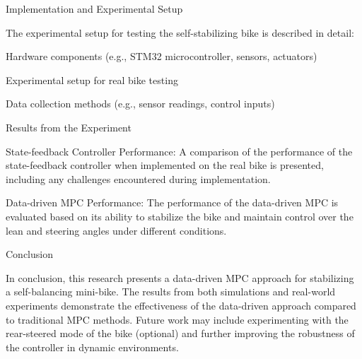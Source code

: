 Implementation and Experimental Setup

The experimental setup for testing the self-stabilizing bike is described in detail:

Hardware components (e.g., STM32 microcontroller, sensors, actuators)

Experimental setup for real bike testing

Data collection methods (e.g., sensor readings, control inputs)

Results from the Experiment

State-feedback Controller Performance:
A comparison of the performance of the state-feedback controller when implemented on the real bike is presented, including any challenges encountered during implementation.

Data-driven MPC Performance:
The performance of the data-driven MPC is evaluated based on its ability to stabilize the bike and maintain control over the lean and steering angles under different conditions.

Conclusion

In conclusion, this research presents a data-driven MPC approach for stabilizing a self-balancing mini-bike. The results from both simulations and real-world experiments demonstrate the effectiveness of the data-driven approach compared to traditional MPC methods. Future work may include experimenting with the rear-steered mode of the bike (optional) and further improving the robustness of the controller in dynamic environments.
